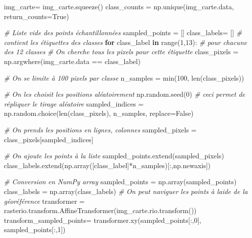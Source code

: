 \documentclass[
]{article}
\newenvironment{Shaded}{}{}
\newcommand{\BuiltInTok}[1]{\textcolor[rgb]{0.00,0.50,0.00}{#1}}
\newcommand{\CommentTok}[1]{\textcolor[rgb]{0.38,0.63,0.69}{\textit{#1}}}
\newcommand{\ControlFlowTok}[1]{\textcolor[rgb]{0.00,0.44,0.13}{\textbf{#1}}}
\newcommand{\DecValTok}[1]{\textcolor[rgb]{0.25,0.63,0.44}{#1}}
\newcommand{\KeywordTok}[1]{\textcolor[rgb]{0.00,0.44,0.13}{\textbf{#1}}}
\newcommand{\NormalTok}[1]{#1}
\newcommand{\OperatorTok}[1]{\textcolor[rgb]{0.40,0.40,0.40}{#1}}
\newcommand{\VariableTok}[1]{\textcolor[rgb]{0.10,0.09,0.49}{#1}}
\begin{document}
\label{e42f4b0e}
\label{cb11}
\begin{Shaded}
\begin{Highlighting}[]
\NormalTok{img\_carte}\OperatorTok{=}\NormalTok{ img\_carte.squeeze()}
\NormalTok{class\_counts }\OperatorTok{=}\NormalTok{ np.unique(img\_carte.data, return\_counts}\OperatorTok{=}\VariableTok{True}\NormalTok{)}

\CommentTok{\# Liste vide des points échantillonnées}
\NormalTok{sampled\_points }\OperatorTok{=}\NormalTok{ []}
\NormalTok{class\_labels}\OperatorTok{=}\NormalTok{ [] }\CommentTok{\# contient les étiquettes des classes}
\ControlFlowTok{for}\NormalTok{ class\_label }\KeywordTok{in} \BuiltInTok{range}\NormalTok{(}\DecValTok{1}\NormalTok{,}\DecValTok{13}\NormalTok{): }\CommentTok{\# pour chacune des 12 classes}
  \CommentTok{\# On cherche tous les pixels pour cette étiquette}
\NormalTok{  class\_pixels }\OperatorTok{=}\NormalTok{ np.argwhere(img\_carte.data }\OperatorTok{==}\NormalTok{ class\_label)}

  \CommentTok{\# On se limite à 100 pixels par classe}
\NormalTok{  n\_samples }\OperatorTok{=} \BuiltInTok{min}\NormalTok{(}\DecValTok{100}\NormalTok{, }\BuiltInTok{len}\NormalTok{(class\_pixels))}

  \CommentTok{\# On les choisit les positions aléatoirement}
\NormalTok{  np.random.seed(}\DecValTok{0}\NormalTok{) }\CommentTok{\# ceci permet de répliquer le tirage aléatoire}
\NormalTok{  sampled\_indices }\OperatorTok{=}\NormalTok{ np.random.choice(}\BuiltInTok{len}\NormalTok{(class\_pixels), n\_samples, replace}\OperatorTok{=}\VariableTok{False}\NormalTok{)}

  \CommentTok{\# On prends les positions en lignes, colonnes}
\NormalTok{  sampled\_pixels }\OperatorTok{=}\NormalTok{ class\_pixels[sampled\_indices]}

  \CommentTok{\# On ajoute les points à la liste}
\NormalTok{  sampled\_points.extend(sampled\_pixels)}
\NormalTok{  class\_labels.extend(np.array([class\_label]}\OperatorTok{*}\NormalTok{n\_samples)[:,np.newaxis])}

\CommentTok{\# Conversion en NumPy array}
\NormalTok{sampled\_points }\OperatorTok{=}\NormalTok{ np.array(sampled\_points)}
\NormalTok{class\_labels }\OperatorTok{=}\NormalTok{ np.array(class\_labels)}
\CommentTok{\# On peut naviguer les points à l\textquotesingle{}aide de la géoréférence}
\NormalTok{transformer }\OperatorTok{=}\NormalTok{ rasterio.transform.AffineTransformer(img\_carte.rio.transform())}
\NormalTok{transform\_sampled\_points}\OperatorTok{=}\NormalTok{ transformer.xy(sampled\_points[:,}\DecValTok{0}\NormalTok{], sampled\_points[:,}\DecValTok{1}\NormalTok{])}


\end{Highlighting}
\end{Shaded}
\end{document}
